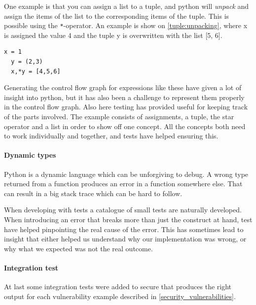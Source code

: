 One example is that you can assign a list to a tuple, and python will \emph{unpack} and assign the items of the list to the corresponding items of the tuple.
This is possible using the \texttt{*}-operator.
An example is show on \cref{tuple:unpacking}, where x is assigned the value 4 and the tuple y is overwritten with the list [5, 6].
\begin{lstlisting}[style=python, caption={Tuple unpacking}, label=tuple:unpacking]
  x = 1
  y = (2,3)
  x,*y = [4,5,6]
\end{lstlisting}

Generating the control flow graph for expressions like these have given a lot of insight into python, but it has also been a challenge to represent them properly in the control flow graph.
Also here testing has provided useful for keeping track of the parts involved.
The example consists of assignments, a tuple, the star operator and a list in order to show off one concept.
All the concepts both need to work individually and together, and tests have helped ensuring this.

\paragraph{Dynamic types}
Python is a dynamic language which can be unforgiving to debug.
A wrong type returned from a function produces an error in a function somewhere else.
That can result in a big stack trace which can be hard to follow.

When developing with tests a catalogue of small tests are naturally developed.
When introducing an error that breaks more than just the construct at hand, test have helped pinpointing the real cause of the error.
This has sometimes lead to insight that either helped us understand why our implementation was wrong, or why what we expected was not the real outcome.

\paragraph{Integration test}
At last some integration tests were added to secure that \pyt{} produces the right output for each vulnerability example described in \cref{security_vulnerabilities}.
